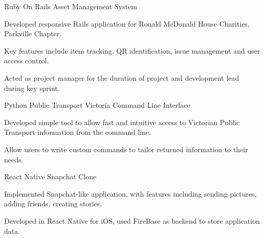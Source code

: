 \begin{cventries}
  \cventry
    {Ruby On Rails}
    {Asset Management System}
    {}
    {}
    {
      \begin{cvitems}
        \item {Developed responsive Rails application for Ronald McDonald House Charities, Parkville Chapter.}
        \item {Key features include item tracking, QR identification, issue management and user access control.}
        \item {Acted as project manager for the duration of project and development lead during key sprint.}
      \end{cvitems}
    }
  \cventry
    {Python}
    {Public Transport Victoria Command Line Interface}
    {}
    {}
    {
      \begin{cvitems}
      	\item {Developed simple tool to allow fast and intuitive access to Victorian Public Transport information from the command line.}
        \item {Allow users to write custom commands to tailor returned information to their needs.}
      \end{cvitems}
    }
   \cventry
    {React Native}
    {Snapchat Clone}
    {}
    {}
    {
      \begin{cvitems}
      	\item {Implemented Snapchat-like application, with features including sending pictures, adding friends, creating stories.}
      	\item {Developed in React Native for iOS, used FireBase as backend to store application data.}
      \end{cvitems}
    }
\end{cventries}
\vspace{-5mm}
